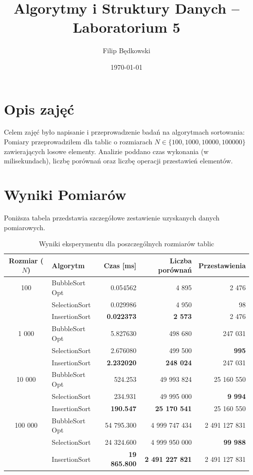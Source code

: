 \documentclass[11pt, a4paper]{article}
\title{Algorytmy i Struktury Danych -- Laboratorium 5}
\author{Filip Będkowski}
\date{\today}
\begin{document}
\maketitle

\section{Opis zajęć}
Celem zajęć było napisanie i przeprowadzenie badań na algorytmach sortowania:
Pomiary przeprowadziłem dla tablic o rozmiarach $N \in \{100, 1000, 10000, 100000\}$ zawierających losowe elementy. Analizie poddano czas wykonania (w milisekundach), liczbę porównań oraz liczbę operacji przestawień elementów.

\section{Wyniki Pomiarów}

Poniższa tabela przedstawia szczegółowe zestawienie uzyskanych danych pomiarowych.

\begin{table}[h!]
\centering
\caption{Wyniki eksperymentu dla poszczególnych rozmiarów tablic}
\vspace{0.5em}
\begin{tabular}{c l r r r}
\toprule
\textbf{Rozmiar ($N$)} & \textbf{Algorytm} & \textbf{Czas [ms]} & \textbf{Liczba porównań} & \textbf{Przestawienia} \\
\midrule
100 & BubbleSort Opt & 0.054562 & 4 895 & 2 476 \\
    & SelectionSort & 0.029986 & 4 950 & 98 \\
    & InsertionSort & \textbf{0.022373} & \textbf{2 573} & 2 476 \\
\midrule
1 000 & BubbleSort Opt & 5.827630 & 498 680 & 247 031 \\
      & SelectionSort & 2.676080 & 499 500 & \textbf{995} \\
      & InsertionSort & \textbf{2.232020} & \textbf{248 024} & 247 031 \\
\midrule
10 000 & BubbleSort Opt & 524.253 & 49 993 824 & 25 160 550 \\
       & SelectionSort & 234.931 & 49 995 000 & \textbf{9 994} \\
       & InsertionSort & \textbf{190.547} & \textbf{25 170 541} & 25 160 550 \\
\midrule
100 000 & BubbleSort Opt & 54 795.300 & 4 999 747 434 & 2 491 127 831 \\
        & SelectionSort & 24 324.600 & 4 999 950 000 & \textbf{99 988} \\
        & InsertionSort & \textbf{19 865.800} & \textbf{2 491 227 821} & 2 491 127 831 \\
\bottomrule
\end{tabular}
\end{table}
\end{document}
